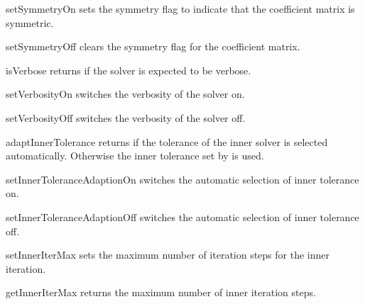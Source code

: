 \begin{methoddesc}[SolverOptions]{setSymmetryOn}{}
sets the symmetry flag to indicate that the coefficient matrix is symmetric.
\end{methoddesc}

\begin{methoddesc}[SolverOptions]{setSymmetryOff}{}
clears the symmetry flag for the coefficient matrix.
\end{methoddesc}

\begin{methoddesc}[SolverOptions]{isVerbose}{}
returns \True if the solver is expected to be verbose.
\end{methoddesc}

\begin{methoddesc}[SolverOptions]{setVerbosityOn}{}
switches the verbosity of the solver on.
\end{methoddesc}

\begin{methoddesc}[SolverOptions]{setVerbosityOff}{}
switches the verbosity of the solver off.
\end{methoddesc}

\begin{methoddesc}[SolverOptions]{adaptInnerTolerance}{}
returns \True if the tolerance of the inner solver is selected automatically.
Otherwise the inner tolerance set by  is used.
\end{methoddesc}

\begin{methoddesc}[SolverOptions]{setInnerToleranceAdaptionOn}{}
switches the automatic selection of inner tolerance on.
\end{methoddesc}

\begin{methoddesc}[SolverOptions]{setInnerToleranceAdaptionOff}{}
switches the automatic selection of inner tolerance off.
\end{methoddesc}

\begin{methoddesc}[SolverOptions]{setInnerIterMax}{}
sets the maximum number of iteration steps for the inner iteration.
\end{methoddesc}

\begin{methoddesc}[SolverOptions]{getInnerIterMax}{}
returns the maximum number of inner iteration steps.
\end{methoddesc}

